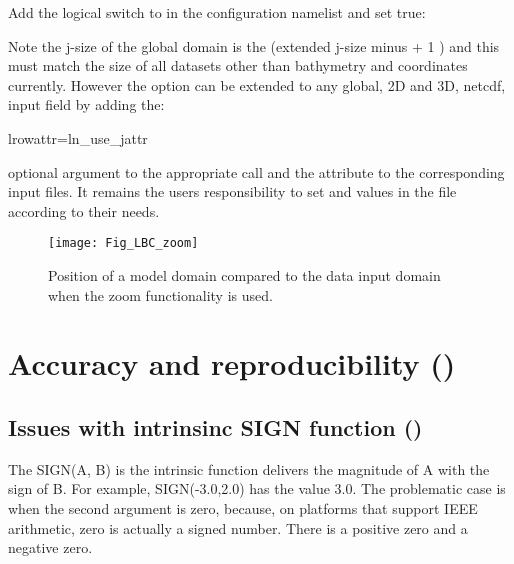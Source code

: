 \documentclass[../main/NEMO_manual]{subfiles}
\begin{document}
\noindent Add the logical switch to  in the configuration namelist and set true:


\noindent Note the j-size of the global domain is the (extended j-size minus  + 1 ) and
this must match the size of all datasets other than bathymetry and coordinates currently.
However the option can be extended to any global, 2D and 3D, netcdf, input field by adding the:
\vspace{-10pt}
\begin{forlines}
lrowattr=ln_use_jattr
\end{forlines}
optional argument to the appropriate  call and the  attribute to
the corresponding input files.
It remains the users responsibility to set  and  values in
the  file according to their needs.

\begin{figure}[!ht]
  \begin{center}
    \texttt{[image: Fig\_LBC\_zoom]}
    \caption{
      \protect\label{fig:LBC_zoom}
      Position of a model domain compared to the data input domain when the zoom functionality is used.
    }
  \end{center}
\end{figure}


\section{Accuracy and reproducibility (\protect{})}
\label{sec:MISC_fortran}

\subsection{Issues with intrinsinc SIGN function (\protect{})}
\label{subsec:MISC_sign}

The SIGN(A, B) is the \fortran intrinsic function delivers the magnitude of A with the sign of B.
For example, SIGN(-3.0,2.0) has the value 3.0.
The problematic case is when the second argument is zero, because, on platforms that support IEEE arithmetic,
zero is actually a signed number.
There is a positive zero and a negative zero.
\end{document}
